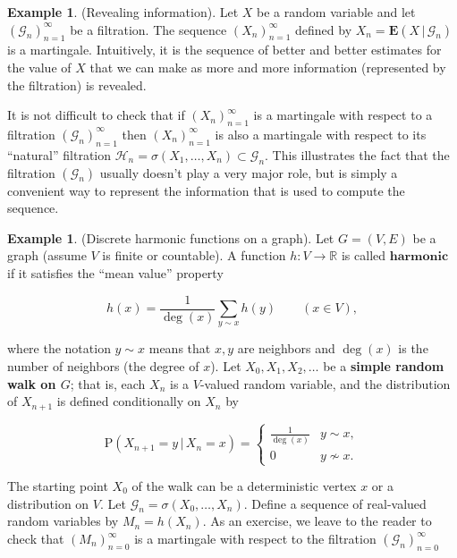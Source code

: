 \documentclass[11pt]{report}
\newcommand{\R}{\mathbb{R}}
\theoremstyle{plain}
\theoremstyle{definition}
\newtheorem{example}[thm]{Example}
\begin{document}
\begin{example}
(Revealing information). Let $X$ be a random variable
and let $(\mathcal{G}_n)_{n=1}^\infty$ be a
filtration. The sequence $(X_n)_{n=1}^\infty$ defined
by $X_n = \mathbf{E}\left(X\,|\,\mathcal{G}_n\right)$
is a martingale. Intuitively, it is the sequence of
better and better estimates for the value of $X$ that
we can make as more and more information (represented
by the filtration) is revealed.
\end{example}

\noindent It is not difficult to check that if
$(X_n)_{n=1}^\infty$ is a martingale with respect to
a filtration $(\mathcal{G}_n)_{n=1}^\infty$ then
$(X_n)_{n=1}^\infty$ is also a martingale with
respect to its ``natural'' filtration
$\mathcal{H}_n=\sigma(X_1,\ldots,X_n) \subset
\mathcal{G}_n$.
This illustrates the fact that the filtration
$(\mathcal{G}_n)$ usually doesn't play a very major
role, but is simply a convenient way to represent the
information that is used to compute the sequence.

\begin{example}
(Discrete harmonic functions on a graph). Let
$G=(V,E)$ be a graph (assume $V$ is finite or
countable). A function $h:V\to\R$ is called
$\textbf{harmonic}$ if it satisfies the ``mean
value'' property

\[
h(x) = \frac{1}{\operatorname{deg}(x)}\sum_{y \sim x} h(y) \qquad (x\in V),
\]

\noindent where the notation $y\sim x$ means that $x,y$ are
neighbors and $\operatorname{deg}(x)$ is the number
of neighbors (the degree of $x$). Let
$X_0,X_1,X_2,\ldots$ be a \textbf{simple random walk on $G$};
that is, each $X_n$ is a $V$-valued random variable,
and the distribution of $X_{n+1}$ is defined
conditionally on $X_n$ by

\[
\mathrm{P}(X_{n+1} = y\,|\,X_n=x) = \begin{cases} \frac{1}{\operatorname{deg}(x)} & y\sim x, \\ 0 & y\nsim x.
\end{cases}
\]

\noindent The starting point $X_0$ of the walk can be a
deterministic vertex $x$ or a distribution on $V$.
Let $\mathcal{G}_n=\sigma(X_0,\ldots,X_n)$. Define a
sequence of real-valued random variables by
$M_n = h(X_n)$. As an exercise, we leave to the
reader to check that $(M_n)_{n=0}^\infty$ is a
martingale with respect to the filtration
$(\mathcal{G}_n)_{n=0}^\infty$
\end{example}
\end{document}
